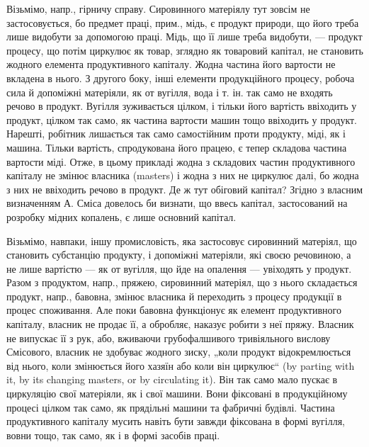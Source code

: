 Візьмімо, напр., гірничу справу. Сировинного матеріялу тут зовсім не
застосовується, бо предмет праці, прим., мідь, є продукт природи, що
його треба лише видобути за допомогою праці. Мідь, що її лише треба
видобути, — продукт процесу, що потім циркулює як товар, зглядно як
товаровий капітал, не становить жодного елемента продуктивного капіталу.
Жодна частина його вартости не вкладена в нього. З другого боку,
інші елементи продукційного процесу, робоча сила й допоміжні матеріяли,
як от вугілля, вода і т. ін. так само не входять речово в продукт.
Вугілля зуживається цілком, і тільки його вартість ввіходить у продукт,
цілком так само, як частина вартости машин тощо ввіходить у продукт.
Нарешті, робітник лишається так само самостійним проти продукту, міді,
як і машина. Тільки вартість, спродукована його працею, є тепер складова
частина вартости міді. Отже, в цьому прикладі жодна з складових
частин продуктивного капіталу не змінює власника (masters) і жодна з
них не циркулює далі, бо жодна з них не ввіходить речово в продукт.
Де ж тут обіговий капітал? Згідно з власним визначенням А. Сміса довелось
би визнати, що ввесь капітал, застосований на розробку мідних
копалень, є лише основний капітал.

Візьмімо, навпаки, іншу промисловість, яка застосовує сировинний
матеріял, що становить субстанцію продукту, і допоміжні матеріяли, які
своєю речовиною, а не лише вартістю — як от вугілля, що йде на опалення
— увіходять у продукт. Разом з продуктом, напр., пряжею, сировинний
матеріял, що з нього складається продукт, напр., бавовна, змінює
власника й переходить з процесу продукції в процес споживання. Але
поки бавовна функціонує як елемент продуктивного капіталу, власник не
продає її, а обробляє, наказує робити з неї пряжу. Власник не випускає
її з рук, або, вживаючи грубофалшивого тривіяльного вислову Смісового,
власник не здобуває жодного зиску, „коли продукт відокремлюється від
нього, коли змінюється його хазяїн або коли він циркулює“ (by parting
with it, by its changing masters, or by circulating it). Він так само мало
пускає в циркуляцію свої матеріяли, як і свої машини. Вони фіксовані
в продукційному процесі цілком так само, як прядільні машини та фабричні
будівлі. Частина продуктивного капіталу мусить навіть бути завжди
фіксована в формі вугілля, вовни тощо, так само, як і в формі засобів
праці.

